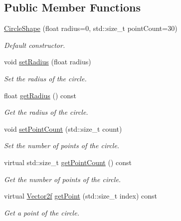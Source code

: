 \subsection*{Public Member Functions}
\begin{DoxyCompactItemize}
\item 
\hyperlink{classsf_1_1_circle_shape_aaebe705e7180cd55588eb19488af3af1}{Circle\+Shape} (float radius=0, std\+::size\+\_\+t point\+Count=30)
\begin{DoxyCompactList}\small\item\em Default constructor. \end{DoxyCompactList}\item 
void \hyperlink{classsf_1_1_circle_shape_a21cdf85fc2f201e10222a241af864be0}{set\+Radius} (float radius)
\begin{DoxyCompactList}\small\item\em Set the radius of the circle. \end{DoxyCompactList}\item 
float \hyperlink{classsf_1_1_circle_shape_aa3dd5a1b5031486ce5b6f09d43674aa3}{get\+Radius} () const
\begin{DoxyCompactList}\small\item\em Get the radius of the circle. \end{DoxyCompactList}\item 
void \hyperlink{classsf_1_1_circle_shape_a16590ee7bdf5c9f752275468a4997bed}{set\+Point\+Count} (std\+::size\+\_\+t count)
\begin{DoxyCompactList}\small\item\em Set the number of points of the circle. \end{DoxyCompactList}\item 
virtual std\+::size\+\_\+t \hyperlink{classsf_1_1_circle_shape_a014d29ec11e8afa4dce50e7047d99601}{get\+Point\+Count} () const
\begin{DoxyCompactList}\small\item\em Get the number of points of the circle. \end{DoxyCompactList}\item 
virtual \hyperlink{classsf_1_1_vector2}{Vector2f} \hyperlink{classsf_1_1_circle_shape_a2d7f9715502b960b92387102fddb8736}{get\+Point} (std\+::size\+\_\+t index) const
\begin{DoxyCompactList}\small\item\em Get a point of the circle. \end{DoxyCompactList}\end{DoxyCompactItemize}
